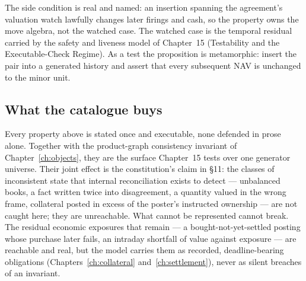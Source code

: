 The side condition is real and named: an insertion spanning the agreement's
valuation watch lawfully changes later firings and cash, so the property owns the
move algebra, not the watched case. The watched case is the temporal residual
carried by the safety and liveness model of Chapter~15 (Testability and the
Executable-Check Regime). As a test the proposition is metamorphic: insert the
pair into a generated history and assert that every subsequent NAV is unchanged to
the minor unit.

\subsection{What the catalogue buys}

Every property above is stated once and executable, none defended in prose alone.
Together with the product-graph consistency invariant of
Chapter~\ref{ch:objects}, they are the surface Chapter~15 tests over one
generator universe. Their joint effect is the constitution's claim in \S 11: the
classes of inconsistent state that internal reconciliation exists to detect ---
unbalanced books, a fact written twice into disagreement, a quantity valued in the
wrong frame, collateral posted in excess of the poster's instructed ownership --- are
not caught here; they are unreachable. What cannot be represented cannot break. The
residual economic exposures that remain --- a bought-not-yet-settled posting whose
purchase later fails, an intraday shortfall of value against exposure --- are reachable
and real, but the model carries them as recorded, deadline-bearing obligations
(Chapters~\ref{ch:collateral} and~\ref{ch:settlement}), never as silent breaches of an
invariant.
